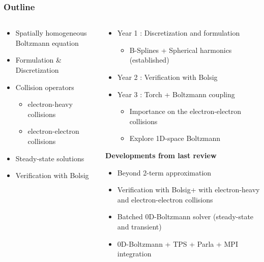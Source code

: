 \documentclass[mathserif, aspectratio=169]{beamer}
\begin{document}
\begin{frame}
	\frametitle{Outline}
	\begin{columns}
		\begin{column}{0.4\textwidth}
				\begin{itemize}
				\item Spatially homogeneous Boltzmann equation
				\item Formulation \& Discretization
				\item Collision operators
				\begin{itemize}
					\item electron-heavy collisions
					\item electron-electron collisions
				\end{itemize}
				\item Steady-state solutions
				\item Verification with Bolsig
			\end{itemize}
		\end{column}
		\begin{column}{0.6\textwidth}
			\begin{itemize}
				\item Year 1 : Discretization and formulation 
				\begin{itemize}
					\item B-Splines + Spherical harmonics (established)
				\end{itemize}	
				\item Year 2 : Verification with Bolsig
				\item Year 3 : Torch + Boltzmann coupling
					\begin{itemize}
						\item Importance on the electron-electron collisions
						\item Explore 1D-space Boltzmann
					\end{itemize}
			\end{itemize}
			\vspace{0.25in}
			\textbf{Developments from last review}
				\begin{itemize}
					\item Beyond 2-term approximation
					\item Verification with Bolsig+ with electron-heavy and electron-electron collisions
					\item Batched 0D-Boltzmann solver (steady-state and transient)
					\item 0D-Boltzmann + TPS + Parla + MPI integration
				\end{itemize}
		\end{column}
	\end{columns}


\end{frame}
\end{document}
